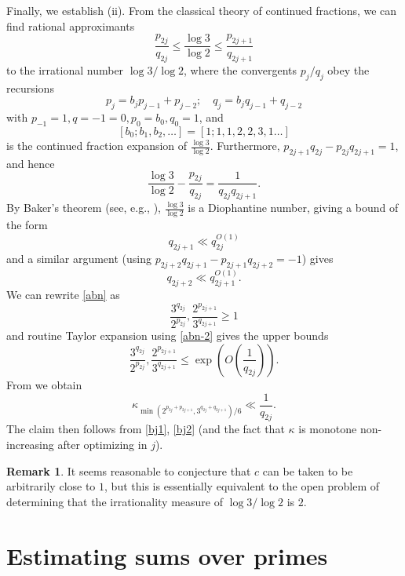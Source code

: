 \documentclass[10pt,a4paper,reqno]{amsart}
\numberwithin{equation}{section}
\theoremstyle{plain}
\theoremstyle{definition}
\newtheorem{remark}[remark]{Remark}
\begin{document}
Finally, we establish (ii).  From the classical theory of continued fractions, we can find rational approximants
\begin{equation}\label{abn}
 \frac{p_{2j}}{q_{2j}} \leq \frac{\log 3}{\log 2} \leq \frac{p_{2j+1}}{q_{2j+1}}
\end{equation}
to the irrational number $\log 3/\log 2$, where the convergents $p_j/q_j$ obey the recursions
$$ p_j = b_j p_{j-1} + p_{j-2}; \quad q_j = b_j q_{j-1} + q_{j-2}$$
with $p_{-1} = 1, q={-1}=0, p_0 = b_0, q_0=1$, and
$$[b_0;b_1,b_2,\dots] = [1;1,1,2,2,3,1\dots]$$
is the continued fraction expansion of $\frac{\log 3}{\log 2}$.  Furthermore, $p_{2j+1}q_{2j} - p_{2j} q_{2j+1} = 1$, and hence
\begin{equation}\label{abn-2}
  \frac{\log 3}{\log 2} - \frac{p_{2j}}{q_{2j}} = \frac{1}{q_{2j} q_{2j+1}}.
\end{equation}
By Baker's theorem (see, e.g., \cite{baker-wustholz}), $\frac{\log 3}{\log 2}$ is a Diophantine number, giving a bound of the form
\begin{equation}\label{bj1}
   q_{2j+1} \ll q_{2j}^{O(1)}
\end{equation}
and a similar argument (using $p_{2j+2} q_{2j+1}-p_{2j+1} q_{2j+2} = -1$) gives
\begin{equation}\label{bj2}
 q_{2j+2} \ll q_{2j+1}^{O(1)}.
\end{equation}
We can rewrite \eqref{abn} as
$$ \frac{3^{q_{2j}}}{2^{p_{2j}}}, \frac{2^{p_{2j+1}}}{3^{q_{2j+1}}}\geq 1$$
and routine Taylor expansion using \eqref{abn-2} gives the upper bounds
$$ \frac{3^{q_{2j}}}{2^{p_{2j}}}, \frac{2^{p_{2j+1}}}{3^{q_{2j+1}}}\leq \exp\left( O\left( \frac{1}{q_{2j}}\right)\right).$$
From  we obtain
$$
\kappa_{\min(2^{p_{2j} + p_{2j+1}}, 3^{q_{2j}+q_{2j+1}})/6} \ll \frac{1}{q_{2j}}.$$
The claim then follows from \eqref{bj1}, \eqref{bj2} (and the fact that $\kappa$ is monotone non-increasing after optimizing in $j$).

\begin{remark}
It seems reasonable to conjecture that $c$ can be taken to be arbitrarily close to $1$, but this is essentially equivalent to the open problem of determining that the irrationality measure of $\log 3 / \log 2$ is $2$.
\end{remark}


\section{Estimating sums over primes}\label{primes-sec}
\end{document}
